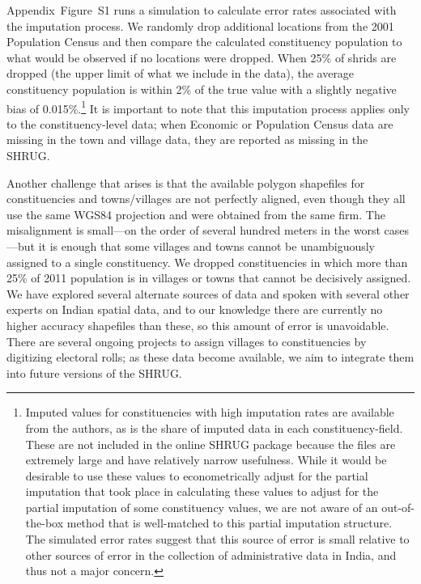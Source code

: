 \documentclass[12pt,letterpaper]{article}
\begin{document}
Appendix~Figure~S1 runs a simulation to calculate
error rates associated with the imputation process. We randomly drop
additional locations from the 2001 Population Census and then compare
the calculated constituency population to what would be observed if no
locations were dropped. When 25\% of shrids are dropped (the upper
limit of what we include in the data), the average constituency
population is within 2\% of the true value with a slightly negative
bias of 0.015\%.\footnote{Imputed values for constituencies with high
  imputation rates are available from the authors, as is the share of
  imputed data in each constituency-field. These are not included in
  the online SHRUG package because the files are extremely large and
  have relatively narrow usefulness. While it would be desirable to
  use these values to econometrically adjust for the partial
  imputation that took place in calculating these values to adjust for
  the partial imputation of some constituency values, we are not aware
  of an out-of-the-box method that is well-matched to this partial
  imputation structure. The simulated error rates suggest that this
  source of error is small relative to other sources of error in the
  collection of administrative data in India, and thus not a major
  concern.} It is important to note that this imputation process
applies only to the constituency-level data; when Economic or
Population Census data are missing in the town and village data, they
are reported as missing in the SHRUG.

Another challenge that arises is that the available polygon shapefiles
for constituencies and towns/villages are not perfectly aligned, even
though they all use the same WGS84 projection and were obtained from
the same firm. The misalignment is small---on the order of several
hundred meters in the worst cases---but it is enough that some
villages and towns cannot be unambiguously assigned to a single
constituency. We dropped constituencies in which more than 25\% of
2011 population is in villages or towns that cannot be decisively
assigned. We have explored several alternate sources of data and
spoken with several other experts on Indian spatial data, and to our
knowledge there are currently no higher accuracy shapefiles than
these, so this amount of error is unavoidable. There are several
ongoing projects to assign villages to constituencies by digitizing
electoral rolls; as these data become available, we aim to integrate
them into future versions of the SHRUG.
\end{document}
